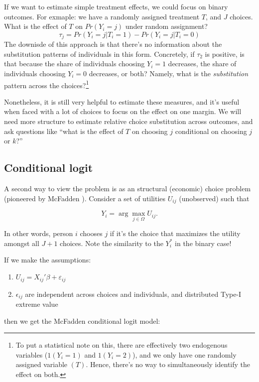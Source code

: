 \documentclass{tufte-handout}
\theoremstyle{break}
\begin{document}
If we want to estimate simple treatment effects, we could focus on binary outcomes. For exmaple: we have a randomly assigned treatment $T$, and $J$ choices. What is the effect of $T$ on $Pr(Y_{i} = j)$ under random assignment?
 \begin{equation}
    \tau_{j} = Pr(Y_{i} = j | T_{i} = 1) -Pr(Y_{i} = j | T_{i} = 0)
 \end{equation}
 The downisde of this approach is that there's no information about the substitution patterns of individuals in this form. Concretely, if $\tau_{2}$ is positive, is that because the share of individuals choosing $Y_{i} = 1$ decreases,  the share of individuals choosing $Y_{i} = 0$ decreases, or both?  Namely, what is the \emph{substitution} pattern across the choices?\footnote{To put a statistical note on this, there are effectively two endogenous variables ($1(Y_{i} = 1) $ and $1(Y_{i} =2)$), and we only have one randomly assigned variable $(T)$. Hence, there's no way to simultaneously identify the effect on both.} 
 
 Nonetheless, it is still very helpful to estimate these measures, and it's useful when faced with a lot of choices to focus on the effect on one margin. We will need more structure to estimate relative choice substitution across outcomes, and ask questions like ``what is the effect of $T$ on choosing $j$ conditional on choosing $j$ or $k$?''
      
\subsection{Conditional logit}
A second way to view the problem is as an structural (economic) choice problem (pioneered by McFadden \citep{mcfadden1972conditional}). Consider a set of utilities $U_{ij}$ (unobserved) such that 
 
\begin{equation}
  Y_{i} = \arg\max_{j \in \Omega}U_{ij}.
\end{equation}

In other words, person $i$ chooses $j$ if it's the choice that maximizes the utility amongst all $J+1$ choices.   Note the similarity to the $Y^{*}_{i}$ in the binary case!

If we make the assumptions:
\begin{enumerate}
\item  $U_{ij} = X_{ij}'\beta + \varepsilon_{ij}$
\item $\epsilon_{ij}$ are independent across choices and
  individuals, and distributed Type-I extreme value
\end{enumerate}
then we get the McFadden conditional logit model:
\end{document}
